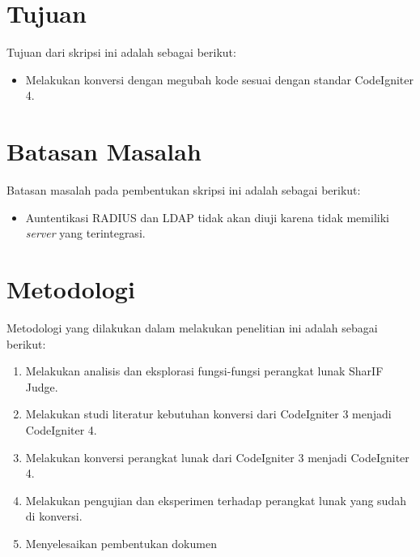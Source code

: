 \section{Tujuan}
\label{sec:tujuan}
Tujuan dari skripsi ini adalah sebagai berikut:
\begin{itemize}
	\item Melakukan konversi dengan megubah kode sesuai dengan standar CodeIgniter 4.
\end{itemize}

\section{Batasan Masalah}
\label{sec:batasan}
Batasan masalah pada pembentukan skripsi ini adalah sebagai berikut:
\begin{itemize}
	\item Auntentikasi RADIUS dan LDAP tidak akan diuji karena tidak memiliki \textit{server} yang terintegrasi.
\end{itemize}

\section{Metodologi}
\label{sec:metlit}
Metodologi yang dilakukan dalam melakukan penelitian ini adalah sebagai berikut:
\begin{enumerate}
	\item Melakukan analisis dan eksplorasi fungsi-fungsi perangkat lunak SharIF Judge.
	\item Melakukan studi literatur kebutuhan konversi dari CodeIgniter 3 menjadi CodeIgniter 4.
	\item Melakukan konversi perangkat lunak dari CodeIgniter 3 menjadi CodeIgniter 4.
	\item Melakukan pengujian dan eksperimen terhadap perangkat lunak yang sudah di konversi.
	\item Menyelesaikan pembentukan dokumen
\end{enumerate}

